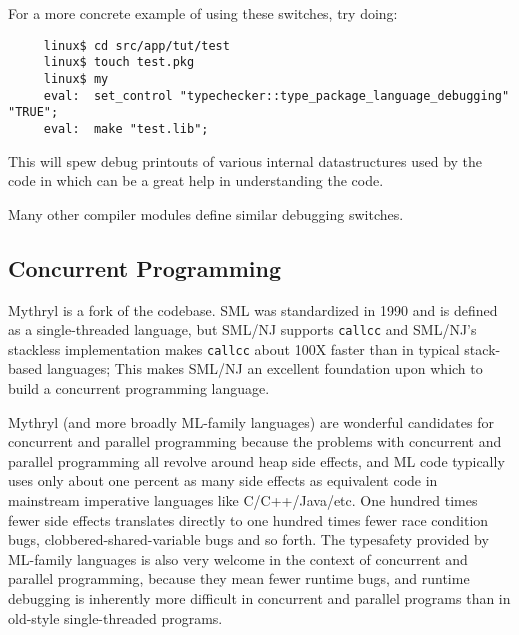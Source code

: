 For a more concrete example of using these switches, try doing:

\begin{verbatim}
     linux$ cd src/app/tut/test
     linux$ touch test.pkg
     linux$ my
     eval:  set_control "typechecker::type_package_language_debugging" "TRUE";
     eval:  make "test.lib";
\end{verbatim}

This will spew debug printouts of various internal datastructures 
used by the code in 
which can be a great help in understanding the code.

Many other compiler modules define similar debugging switches.

\cutend*

\subsection{Concurrent Programming}
\label{section:tut:topic:concurrent-programming}

Mythryl is a fork of the  codebase. 
SML was standardized in 1990 and is defined as a single-threaded language, 
but SML/NJ supports {\tt callcc} and SML/NJ's stackless implementation makes 
{\tt callcc} about 100X faster than in typical stack-based languages;  This 
makes SML/NJ an excellent foundation upon which to build a concurrent programming 
language.

Mythryl (and more broadly ML-family languages) are wonderful candidates for 
concurrent and parallel programming because the problems with concurrent and 
parallel programming all revolve around heap side effects, and ML code typically 
uses only about one percent as many side effects as equivalent code in mainstream 
imperative languages like C/C++/Java/etc.  One hundred times fewer side effects 
translates directly to one hundred times fewer race condition bugs, clobbered-shared-variable 
bugs and so forth.  The typesafety provided by ML-family languages is also very 
welcome in the context of concurrent and parallel programming, because they mean 
fewer runtime bugs, and runtime debugging is inherently more difficult in concurrent 
and parallel programs than in old-style single-threaded programs.

